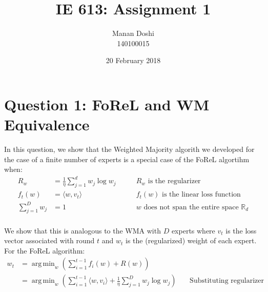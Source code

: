 \documentclass{article}
\title{IE 613: Assignment 1}
\author{Manan Doshi \\ 140100015}
\date{20 February 2018}
\DeclareMathOperator*{\argmin}{arg\,min}
\begin{document}
\graphicspath{{./plots}}
\maketitle

\section*{Question 1: FoReL and WM Equivalence}

In this question, we show that the Weighted Majority algorith we developed for the case of a finite number of experts is a special case of the FoReL algortihm when:
\begin{align*}
    R_w  &= \frac{1}{\eta}\sum_{j=1}^{d} w_j \log w_j \qquad &\text{$R_w$ is the regularizer}\\
    f_t(w) &= \langle w,v_t \rangle \qquad &\text{$f_t(w)$ is the linear loss function}\\
    \sum_{j=1}^{D} w_j &= 1 \qquad &\text{$w$ does not span the entire space $\mathbb{R}_d$}\\
\end{align*}

We show that this is analogous to the WMA with $D$ experts where $v_t$ is the loss vector associated with round $t$ and $w_t$ is the (regularized) weight of each expert.\\
For the FoReL algorithm:
\begin{align*}
    w_t &= \argmin_{w} \left( \sum_{i=1}^{t-1} f_i(w) + R(w) \right) &\qquad\\
    &= \argmin_{w} \left( \sum_{i=1}^{t-1} \langle w,v_i \rangle + \frac{1}{\eta} \sum_{j=1}^{D} w_j \log w_j \right) &\qquad \text{Substituting regularizer and loss terms}\\
\end{align*}
\end{document}
